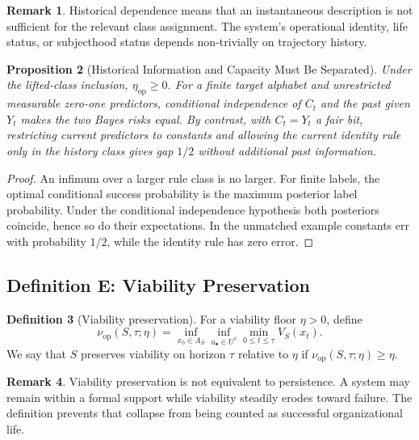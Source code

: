\documentclass[11pt,a4paper]{article}
\newtheorem{proposition}{Proposition}[section]
\theoremstyle{definition}
\newtheorem{definition}[proposition]{Definition}
\newtheorem{remark}[proposition]{Remark}
\newcommand{\Aset}{A_S}
\newcommand{\HistDep}{\eta_{\mathrm{op}}}
\newcommand{\Viab}{\nu_{\mathrm{op}}}
\begin{document}
\begin{remark}
Historical dependence means that an instantaneous description is not sufficient for the relevant class assignment. The system's operational identity, life status, or subjecthood status depends non-trivially on trajectory history.
\end{remark}

\begin{proposition}[Historical Information and Capacity Must Be Separated]\label{prop:history-capacity-control}
Under the lifted-class inclusion, $\HistDep\ge0$. For a finite target alphabet and unrestricted measurable zero-one predictors, conditional independence of $C_t$ and the past given $Y_t$ makes the two Bayes risks equal. By contrast, with $C_t=Y_t$ a fair bit, restricting current predictors to constants and allowing the current identity rule only in the history class gives gap $1/2$ without additional past information.
\end{proposition}
\begin{proof}
An infimum over a larger rule class is no larger. For finite labels, the optimal conditional success probability is the maximum posterior label probability. Under the conditional independence hypothesis both posteriors coincide, hence so do their expectations. In the unmatched example constants err with probability $1/2$, while the identity rule has zero error.
\end{proof}

\subsection{Definition E: Viability Preservation}
\begin{definition}[Viability preservation]\label{def:viability-preservation}
For a viability floor $\eta>0$, define
\[
\Viab(S,\tau;\eta)
=
\inf_{x_0\in \Aset}
\inf_{u_\bullet \in U^\tau}
\min_{0\le t \le \tau} V_S(x_t).
\]
We say that $S$ preserves viability on horizon $\tau$ relative to $\eta$ if $\Viab(S,\tau;\eta)\ge \eta$.
\end{definition}

\begin{remark}
Viability preservation is not equivalent to persistence. A system may remain within a formal support while viability steadily erodes toward failure. The definition prevents that collapse from being counted as successful organizational life.
\end{remark}
\end{document}
